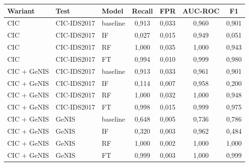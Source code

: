 \begin{tabular}{lllcccc}
\toprule
Wariant & Test & Model & Recall & FPR & AUC-ROC & F1 \\
\midrule
CIC & CIC-IDS2017 & baseline & 0,913 & 0,033 & 0,960 & 0,901 \\
CIC & CIC-IDS2017 & IF & 0,027 & 0,015 & 0,949 & 0,051 \\
CIC & CIC-IDS2017 & RF & 1,000 & 0,035 & 1,000 & 0,943 \\
CIC & CIC-IDS2017 & FT & 0,994 & 0,010 & 0,999 & 0,980 \\
\midrule
CIC + GeNIS & CIC-IDS2017 & baseline & 0,913 & 0,033 & 0,961 & 0,901 \\
CIC + GeNIS & CIC-IDS2017 & IF & 0,114 & 0,007 & 0,958 & 0,200 \\
CIC + GeNIS & CIC-IDS2017 & RF & 1,000 & 0,032 & 1,000 & 0,948 \\
CIC + GeNIS & CIC-IDS2017 & FT & 0,998 & 0,015 & 0,999 & 0,975 \\
\midrule
CIC + GeNIS & GeNIS & baseline & 0,648 & 0,005 & 0,736 & 0,786 \\
CIC + GeNIS & GeNIS & IF & 0,320 & 0,003 & 0,962 & 0,484 \\
CIC + GeNIS & GeNIS & RF & 1,000 & 0,002 & 1,000 & 1,000 \\
CIC + GeNIS & GeNIS & FT & 0,999 & 0,003 & 1,000 & 0,999 \\
\bottomrule
\end{tabular}
